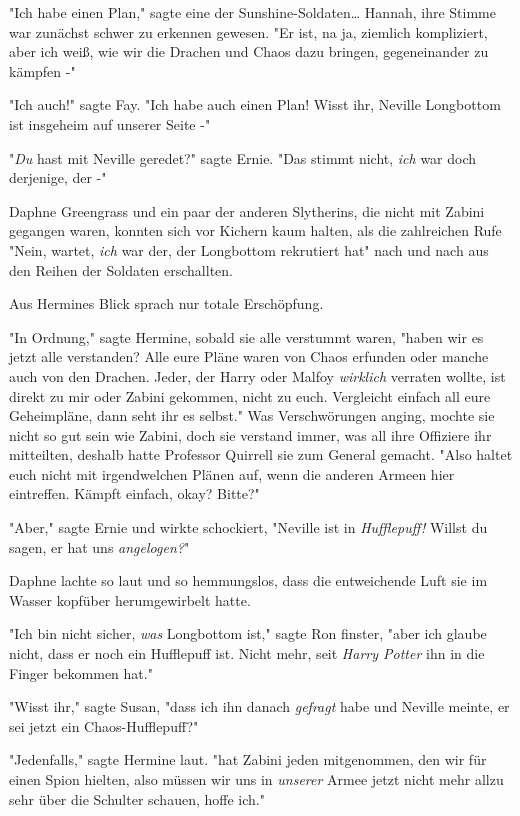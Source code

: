 {"Ich habe einen Plan," sagte eine der Sunshine-Soldaten… Hannah, ihre Stimme war zunächst schwer zu erkennen gewesen. "Er ist, na ja, ziemlich kompliziert, aber ich weiß, wie wir die Drachen und Chaos dazu bringen, gegeneinander zu kämpfen -"

"Ich auch!" sagte Fay. "Ich habe auch einen Plan! Wisst ihr, Neville Longbottom ist insgeheim auf unserer Seite -"

"\emph{Du} hast mit Neville geredet?" sagte Ernie. "Das stimmt nicht, \emph{ich} war doch derjenige, der -"

Daphne Greengrass und ein paar der anderen Slytherins, die nicht mit Zabini gegangen waren, konnten sich vor Kichern kaum halten, als die zahlreichen Rufe "Nein, wartet, \emph{ich} war der, der Longbottom rekrutiert hat" nach und nach aus den Reihen der Soldaten erschallten.

Aus Hermines Blick sprach nur totale Erschöpfung.

"In Ordnung," sagte Hermine, sobald sie alle verstummt waren, "haben wir es jetzt alle verstanden? Alle eure Pläne waren von Chaos erfunden oder manche auch von den Drachen. Jeder, der Harry oder Malfoy \emph{wirklich} verraten wollte, ist direkt zu mir oder Zabini gekommen, nicht zu euch. Vergleicht einfach all eure Geheimpläne, dann seht ihr es selbst." Was Verschwörungen anging, mochte sie nicht so gut sein wie Zabini, doch sie verstand immer, was all ihre Offiziere ihr mitteilten, deshalb hatte Professor Quirrell sie zum General gemacht. "Also haltet euch nicht mit irgendwelchen Plänen auf, wenn die anderen Armeen hier eintreffen. Kämpft einfach, okay? Bitte?"

"Aber," sagte Ernie und wirkte schockiert, "Neville ist in \emph{Hufflepuff!} Willst du sagen, er hat uns \emph{angelogen?}"

Daphne lachte so laut und so hemmungslos, dass die entweichende Luft sie im Wasser kopfüber herumgewirbelt hatte.

"Ich bin nicht sicher, \emph{was} Longbottom ist," sagte Ron finster, "aber ich glaube nicht, dass er noch ein Hufflepuff ist. Nicht mehr, seit \emph{Harry Potter} ihn in die Finger bekommen hat."

"Wisst ihr," sagte Susan, "dass ich ihn danach \emph{gefragt} habe und Neville meinte, er sei jetzt ein Chaos-Hufflepuff?"

"Jedenfalls," sagte Hermine laut. "hat Zabini jeden mitgenommen, den wir für einen Spion hielten, also müssen wir uns in \emph{unserer} Armee jetzt nicht mehr allzu sehr über die Schulter schauen, hoffe ich."

}
